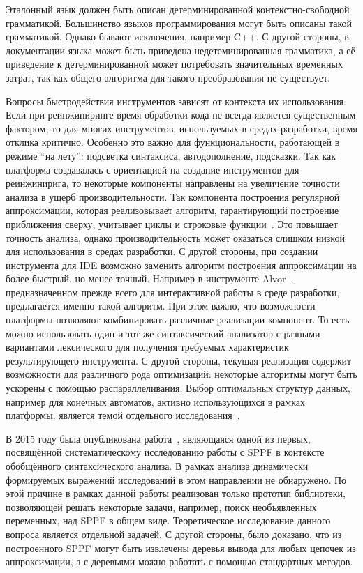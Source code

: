 Эталонный язык должен быть описан детерминированной контекстно-свободной грамматикой. Большинство языков программирования могут быть описаны такой грамматикой. Однако бывают исключения, например C++. С другой стороны, в документации языка может быть приведена недетеминированная грамматика, а её приведение к детерминированной может потребовать значительных временных затрат, так как общего алгоритма для такого преобразования не существует. 

Вопросы быстродействия инструментов зависят от контекста их использования. Если при реинжиниринге время обработки кода не всегда является существенным фактором, то для многих инструментов, используемых  в средах разработки, время отклика критично.  Особенно это важно для функциональности, работающей в режиме ``на лету'': подсветка синтаксиса, автодополнение, подсказки. Так как платформа создавалась с ориентацией на создание инструментов для реинжинирига, то некоторые компоненты направлены на увеличение точности анализа в ущерб производительности. Так компонента построения регулярной аппроксимации, которая реализовывает алгоритм, гарантирующий построение приближения сверху, учитывает циклы и строковые функции~\cite{RegOverApprox}. Это повышает точность анализа, однако производительность может оказаться слишком низкой для использования в средах разработки. С другой стороны, при создании инструмента для IDE возможно заменить алгоритм построения аппроксимации на более быстрый, но менее точный. Например в инструменте Alvor~\cite{Alvor2}, предназначенном прежде всего для интерактивной работы в среде разработки, предлагается именно такой алгоритм.  При этом важно, что возможности платформы позволяют комбинировать различные реализации компонент. То есть можно использовать один и тот же синтаксический анализатор с разными вариантами лексического для получения требуемых характеристик результирующего инструмента. С другой стороны, текущая реализация содержит возможности для различного рода оптимизаций: некоторые алгоритмы могут быть ускорены с помощью распараллеливания. Выбор оптимальных структур данных, например для конечных автоматов, активно использующихся в рамках платформы, является темой отдельного исследования~\cite{DataStructureForFA}.

В 2015 году была опубликована работа~\cite{SPPF2015}, являющаяся одной из первых, посвящённой систематическому исследованию работы с SPPF в контексте обобщённого синтаксического анализа. В рамках  анализа динамически формируемых выражений исследований в этом направлении не обнаружено. По этой причине в рамках данной работы реализован только прототип библиотеки, позволяющей решать некоторые задачи, например, поиск необъявленных переменных, над SPPF в общем виде. Теоретическое исследование данного вопроса является отдельной задачей. С другой стороны, было доказано, что из построенного SPPF могут быть извлечены деревья вывода для любых цепочек из аппроксимации, а с деревьями можно работать с помощью стандартных методов. 

\clearpage

